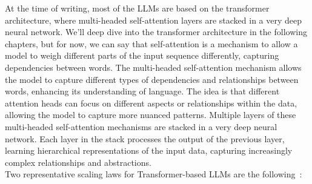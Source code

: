 At the time of writing, most of the LLMs are based on the transformer architecture, where multi-headed self-attention layers are stacked in a very deep neural network.
We'll deep dive into the transformer architecture in the following chapters, but for now, we can say that self-attention is a mechanism to allow a model to weigh different parts of the input sequence differently, capturing dependencies between words.
The multi-headed self-attention mechanism allows the model to capture different types of dependencies and relationships between words, enhancing its understanding of language.
The idea is that different attention heads can focus on different aspects or relationships within the data, allowing the model to capture more nuanced patterns.
Multiple layers of these multi-headed self-attention mechanisms are stacked in a very deep neural network.
Each layer in the stack processes the output of the previous layer, learning hierarchical representations of the input data, capturing increasingly complex relationships and abstractions. \\
Two representative scaling laws for Transformer-based LLMs are the following~\textcite{kaplan2020scaling, hoffmann2022training}:
